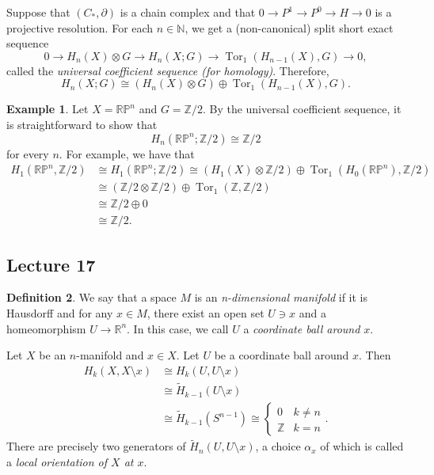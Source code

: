 \documentclass[10pt,letterpaper,cm]{nupset}
\theoremstyle{definition}
\newtheorem{definition}{Definition}[subsection]
\newtheorem{exmp}[definition]{Example}
\theoremstyle{theorem}
\theoremstyle{remark}
\newcommand{\N}{\mathbb N}
\newcommand{\R}{\mathbb{R}}
\newcommand{\RP}{\mathbb{RP}}
\newcommand{\Z}{\mathbb Z}
\newcommand{\1}{\mathbb{1}}
\newcommand{\0}{\vec 0}
\DeclareMathOperator{\tor}{Tor}
\begin{document}
\smallskip

Suppose that $\left(C_{\ast}, \partial\right)$ is a chain complex and that $0 \to P^1 \to P^0 \to H \to 0$ is a projective resolution. For each $n\in \N$, we get a (non-canonical) split short exact sequence $$0 \to H_n(X) \otimes G \to H_n(X; G) \to \tor_1(H_{n-1}(X), G) \to 0    ,$$ called the \textit{universal coefficient sequence (for homology)}. Therefore, $$H_n(X; G) \cong (H_n(X) \otimes G)  \oplus  \tor_1(H_{n-1}(X), G).$$


\begin{exmp}
Let $X= \RP^n$ and $G= \Z/2$. By the universal coefficient sequence, it is straightforward to show that $$H_n(\RP^n; \Z/2) \cong \Z/2 $$ for every $n$. For example, we have that
\begin{align*}
H_1(\RP^n, \Z/2) & \cong H_1(\RP^n; \Z/2) \cong (H_1(X) \otimes \Z/2)  \oplus  \tor_1(H_0(\RP^n), \Z/2)
\\ & \cong (\Z/2 \otimes \Z/2)  \oplus  \tor_1(\Z, \Z/2)
\\ & \cong \Z/2 \oplus 0
\\ & \cong \Z/2.
\end{align*}
\end{exmp}

\subsection{Lecture 17}

\begin{definition}
We say that a space $M$ is an \textit{n-dimensional manifold} if it is Hausdorff and for any $x\in M$, there exist an open set $U \ni x$ and a homeomorphism $U \to \R^n$. In this case, we call $U$ a \textit{coordinate ball around $x$}.
\end{definition}


Let $X$ be an $n$-manifold and $x\in X$. Let $U$ be a coordinate ball around $x$. Then 
\begin{align*} 
 {H}_k(X, X \setminus x) & \cong {H}_k(U, U \setminus x)  \\ &   \cong \widetilde{H}_{k-1}(U\setminus x) \\ & \cong  \widetilde{H}_{k-1}(S^{n-1})  \cong \begin{cases} 0 & k \ne n \\ \Z & k =n \end{cases}.\end{align*} There are precisely two generators of  $\widetilde{H}_n(U, U \setminus x)$, a choice $\alpha_x$ of which is called a \textit{local orientation of $X$ at $x$}.
\end{document}
